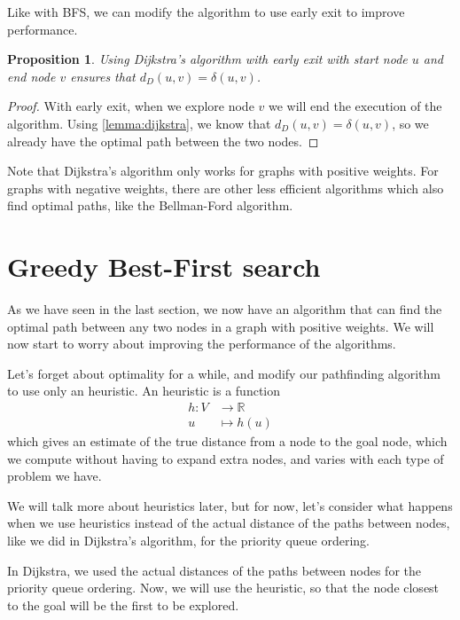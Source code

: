 \documentclass[12pt]{report}
\newtheorem{proposition}[theorem]{Proposition}
\begin{document}
Like with BFS, we can modify the algorithm to use early exit to improve performance.
\begin{proposition}
Using Dijkstra's algorithm with early exit with start node $u$ and end node $v$ ensures that $d_D(u, v) = \delta(u, v)$.
\end{proposition}
\begin{proof}
With early exit, when we explore node $v$ we will end the execution of the algorithm. Using \ref{lemma:dijkstra}, we know that $d_D(u, v) = \delta(u, v)$, so we already have the optimal path between the two nodes.
\end{proof}

Note that Dijkstra's algorithm only works for graphs with positive weights. For graphs with negative weights, there are other less efficient algorithms which also find optimal paths, like the Bellman-Ford algorithm.

\section{Greedy Best-First search}
\label{section:greedy}
As we have seen in the last section, we now have an algorithm that can find the optimal path between any two nodes in a graph with positive weights. We will now start to worry about improving the performance of the algorithms.

Let's forget about optimality for a while, and modify our pathfinding algorithm to use only an heuristic. An heuristic is a function
\begin{align*}
	h \colon V &\to \mathbb{R}\\
	u &\mapsto h(u)
\end{align*}
which gives an estimate of the true distance from a node to the goal node, which we compute without having to expand extra nodes, and varies with each type of problem we have.

We will talk more about heuristics later, but for now, let's consider what happens when we use heuristics instead of the actual distance of the paths between nodes, like we did in Dijkstra's algorithm, for the priority queue ordering. 

In Dijkstra, we used the actual distances of the paths between nodes for the priority queue ordering. Now, we will use the heuristic, so that the node closest to the goal will be the first to be explored.
\end{document}
